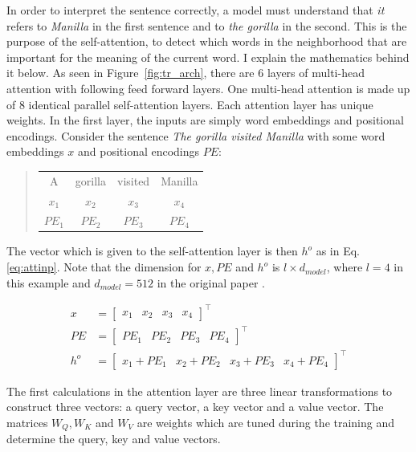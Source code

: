 In order to interpret the sentence correctly, a model must understand that \emph{it} refers to \emph{Manilla} in the first sentence and to \emph{the gorilla} in the second. This is the purpose of the self-attention, to detect which words in the neighborhood that are important for the meaning of the current word. I explain the mathematics behind it below. 
As seen in Figure~\ref{fig:tr_arch}, there are 6 layers of multi-head attention with following feed forward layers. One multi-head attention is made up of 8 identical parallel self-attention layers. Each attention layer has unique weights. In the first layer, the inputs are simply word embeddings and positional encodings. Consider the sentence \textit{The gorilla visited Manilla} with some word embeddings $x$ and positional encodings $PE$:
\begin{quote}
\begin{tabular}{cccc}
A &gorilla &visited &Manilla\\
$x_1$&$x_2$&$x_3$&$x_4$\\
$PE_1$&$PE_2$&$PE_3$&$PE_4$\\
\end{tabular}
\end{quote}

The vector which is given to the self-attention layer is then $h^o$ as in Eq. \ref{eq:attinp}. Note that the dimension for $x, PE$ and $h^o$ is $l \times d_{model}$, where $l = 4$ in this example and $d_{model} = 512$ in the original paper \citep{NIPS2017_7181}. 

\begin{align}
    x &= \begin{bmatrix} x_1 & x_2 & x_3 & x_4 \end{bmatrix}^\intercal \\
    PE &= \begin{bmatrix} PE_1 & PE_2 & PE_3 & PE_4
    \end{bmatrix}^\intercal \\
    h^o &= \begin{bmatrix} x_1 + PE_1 & x_2 + PE_2 & x_3 + PE_3 & x_4 + PE_4 \end{bmatrix}^\intercal \label{eq:attinp}
\end{align}

The first calculations in the attention layer are three linear transformations to construct three vectors: a query vector, a key vector and a value vector. The matrices $W_Q, W_K$ and $W_V$ are weights which are tuned during the training and determine the query, key and value vectors. 

